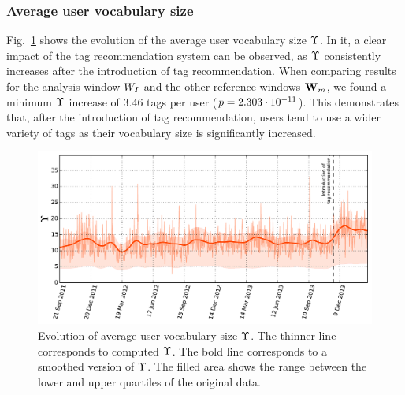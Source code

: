 \subsubsection{Average user vocabulary size}
Fig.~\ref{impact:fig:user_vocabulary_size} shows the evolution of the average user vocabulary size $\Upsilon$. In it, a clear impact of the tag recommendation system can be observed, as $\Upsilon$ consistently increases after the introduction of tag recommendation. When comparing results for the analysis window $W_I$ and the other reference windows $\mathbf{W}_m$, we found a minimum $\Upsilon$ increase of 3.46 tags per user ($p = 2.303\cdot 10^{-11}$). 
This demonstrates that, after the introduction of tag recommendation, users tend to use a wider variety of tags as their vocabulary size is significantly increased.


\begin{figure}
\centerline{\includegraphics[width=\figSizeMax]{ch05_impact/pics/fig06_user_vocabulary_size}}
\caption[Evolution of average user vocabulary size]{Evolution of average user vocabulary size $\Upsilon$. The thinner line corresponds to computed $\Upsilon$. The bold line corresponds to a smoothed version of $\Upsilon$. The filled area shows the range between the lower and upper quartiles of the original data. 
}
\label{impact:fig:user_vocabulary_size}
\end{figure}


